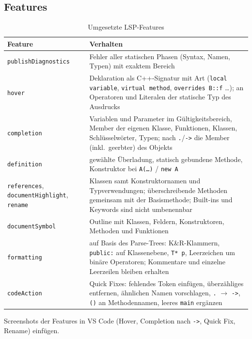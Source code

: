 \documentclass[11pt,a4paper,parskip=half,headsepline,toc=flat]{scrartcl}
\newcommand{\code}[1]{\texttt{#1}}
\newcommand{\thead}{\rowcolor{headbg}}
\newcommand{\hcell}[1]{\textbf{\color{navy}#1}}
\newenvironment{reporttable}[1][]%
  {\begin{table}[htbp]\centering\small\renewcommand{\arraystretch}{1.25}\rowcolors{2}{white}{zebra}}%
  {\end{table}}
\begin{document}
\subsection{Features}
\begin{reporttable}
\begin{tabular}{L{0.28}L{0.64}}
\thead \hcell{Feature} & \hcell{Verhalten} \\ \midrule
\code{publishDiagnostics} & Fehler aller statischen Phasen (Syntax, Namen, Typen) mit exaktem Bereich \\
\code{hover} & Deklaration als C++-Signatur mit Art (\code{local variable}, \code{virtual method},
  \code{overrides B::f} \dots); an Operatoren und Literalen der statische Typ des Ausdrucks \\
\code{completion} & Variablen und Parameter im Gültigkeitsbereich, Member der eigenen Klasse, Funktionen, Klassen,
  Schlüsselwörter, Typen; nach \code{.}/\code{->} die Member (inkl.\ geerbter) des Objekts \\
\code{definition} & gewählte Überladung, statisch gebundene Methode, Konstruktor bei \code{A(\dots)} /
  \code{new A} \\
\code{references}, \code{documentHighlight}, \code{rename} & Klassen samt Konstruktornamen und Typverwendungen;
  überschreibende Methoden gemeinsam mit der Basismethode; Built-ins und Keywords sind nicht umbenennbar \\
\code{documentSymbol} & Outline mit Klassen, Feldern, Konstruktoren, Methoden und Funktionen \\
\code{formatting} & auf Basis des Parse-Trees: K\&R-Klammern, \code{public:} auf Klassenebene, \code{T* p},
  Leerzeichen um binäre Operatoren; Kommentare und einzelne Leerzeilen bleiben erhalten \\
\code{codeAction} & Quick Fixes: fehlendes Token einfügen, überzähliges entfernen, ähnlichen Namen vorschlagen,
  \code{.} $\rightarrow$ \code{->}, \code{()} an Methodennamen, leeres \code{main} ergänzen \\ \bottomrule
\end{tabular}
\caption{Umgesetzte LSP-Features}
\end{reporttable}

\begin{todo}
Screenshots der Features in VS Code (Hover, Completion nach \code{->}, Quick Fix, Rename) einfügen.
\end{todo}
\end{document}
